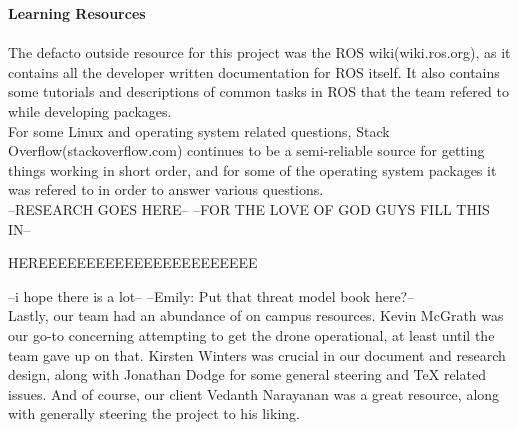 \documentclass[IEEEtran,letterpaper,10pt,notitlepage,draftclsnofoot,onecolumn]{article}
\begin{document}
\LARGE\textbf{Learning Resources\\ \\}\normalsize
The defacto outside resource for this project was the ROS wiki\cite{ROSWIKI}(wiki.ros.org), as it
contains all the developer written documentation for ROS itself. It also
contains some tutorials and descriptions of common tasks in ROS that the
team refered to while developing packages.\\
For some Linux and operating system related questions, Stack Overflow\cite{SO}(stackoverflow.com)
continues to be a semi-reliable source for getting things working in short order, and
for some of the operating system packages it was refered to in order to answer 
various questions.\\
--RESEARCH GOES HERE--
--FOR THE LOVE OF GOD GUYS FILL THIS IN--




HEREEEEEEEEEEEEEEEEEEEEEEE




--i hope there is a lot--
--Emily: Put that threat model book here?--\\
Lastly, our team had an abundance of on campus resources. Kevin McGrath was our go-to
concerning attempting to get the drone operational, at least until the team gave up on
that. Kirsten Winters was crucial in our document and research design, along with Jonathan 
Dodge for some general steering and TeX related issues. And of course, our client Vedanth 
Narayanan was a great resource, along with generally steering the project to his liking.
\end{document}
